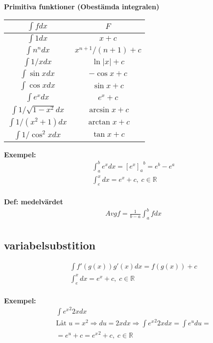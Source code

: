 \textbf{Primitiva funktioner (Obestämda integralen)}
\begin{center}
\begin{tabular}{ |c|c| } 
  \hline
  $\int f dx$             & $F$              \\
  \hline
 $\int 1dx$               & $x+c$            \\
 $\int n^n dx$            & $x^{n+1}/(n+1)+c$ \\ 
 $\int 1/x dx$            & $\ln{|x|}+c$     \\  
 $\int\sin{x}dx$          & $-\cos{x}+c$     \\ 
 $\int\cos{x}dx$          & $\sin{x}+c$      \\
 $\int e^x dx$            & $e^x+c$          \\
 $\int 1/\sqrt{1-x^2} dx$ & $\arcsin{x}+c$   \\
 $\int 1/(x^2+1) dx$      & $\arctan{x}+c$   \\ %
 $\int 1/\cos^2{x} dx$    & $\tan{x}+c$      \\
 \hline
\end{tabular}
\end{center}

\textbf{Exempel: }
\begin{align*}
  &\quad  \int_a^b e^x dx = {{[e^x]}_a}^b = e^b-e^a \\
  &\quad  \int_ e^x dx=e^x + c, \; c \in \mathbb{R} \\
\end{align*}

\textbf{Def: medelvärdet}
\begin{align*}
  &\quad  Avgf = \frac{1}{b-a} \int_a^b f dx \\
\end{align*}


\newpage

\subsection{variabelsubstition}
\begin{align*}
  &\quad  \int f'(g(x))g'(x) dx = f(g(x))+c \\
  &\quad  \int_ e^x dx=e^x + c, \; c \in \mathbb{R} \\
\end{align*}

\textbf{Exempel: }
\begin{align*}
  &\quad  \int {e^x}^2 2x dx  \\
  &\quad  \text{Låt } u=x^2 \Rightarrow du=2x dx \Rightarrow \int {e^x}^2 2x dx=\int e^u du = \\
  &\quad  = e^u+c={e^x}^2+c, \; c\in\mathbb{R} \\
\end{align*}


